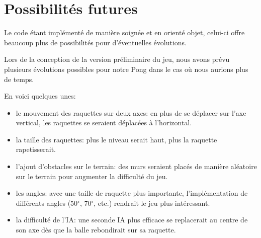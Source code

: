 \section{Possibilités futures}
\label{sec:poss-futures}

Le code étant implémenté de manière soignée et en orienté objet, celui-ci offre
beaucoup plus de possibilités pour d'éventuelles évolutions.

Lors de la conception de la version préliminaire du jeu, nous avons prévu plusieurs
évolutions possibles pour notre Pong dans le cas où nous aurions plus de temps.

En voici quelques unes:
\begin{itemize}
	\item le mouvement des raquettes sur deux axes: en plus de se déplacer sur
	l'axe vertical, les raquettes se seraient déplacées à l'horizontal.
	\item la taille des raquettes: plus le niveau serait haut, plus la raquette rapetisserait.
	\item l'ajout d'obstacles sur le terrain: des murs seraient placés de manière
	aléatoire sur le terrain pour augmenter la difficulté du jeu.
	\item les angles: avec une taille de raquette plus importante, l'implémentation de
	différents angles (50$^{\circ}$, 70$^{\circ}$, etc.) rendrait le jeu plus intéressant.
	\item la difficulté de l'IA: une seconde IA plus efficace se replacerait au centre de
	son axe dès que la balle rebondirait sur sa raquette.
\end{itemize}

